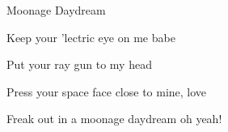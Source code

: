 \begin{song}{Moonage Daydream}{
	
	\chordset[Verse]{ \DMajShA \FshMaj  }
	\vspace{1em}
	\chordset{ \Bm \AMaj \EMaj \GMaj \DMaj \Fshm \BmBassA}

	\chordset[Bridge]{ \GMaj \DMaj \EMaj}
	
}
\begin{songverse}
\end{songverse}
\vfill

\begin{songchorus}

Keep your 'lectric eye on me babe

Put your ray gun  to my head

Press your space face close to mine, love

Freak out in a moonage daydream oh yeah!

\end{songchorus}


\begin{center}
	 \hspace{20pt}  \hspace{20pt}    \hspace{20pt}  
\end{center}

\end{song}